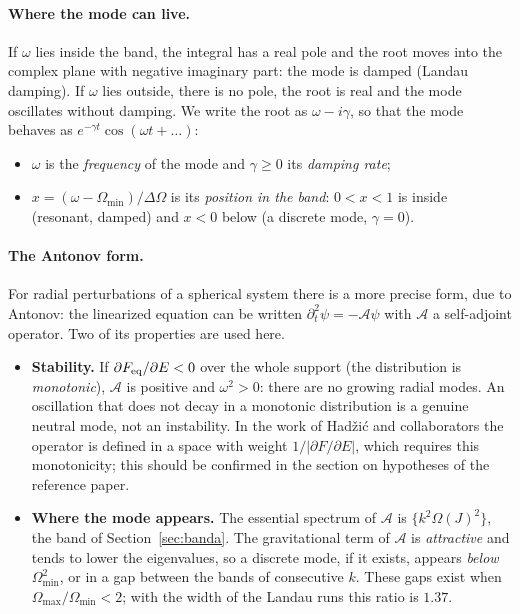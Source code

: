 \documentclass[11pt,a4paper]{article}
\begin{document}
\paragraph{Where the mode can live.} If $\omega$ lies inside the band, the integral has a
real pole and the root moves into the complex plane with negative imaginary part: the
mode is damped (Landau damping). If $\omega$ lies outside, there is no pole, the root is real
and the mode oscillates without damping. We write the root as $\omega-i\gamma$, so that the mode
behaves as $e^{-\gamma t}\cos(\omega t+\dots)$:
\begin{itemize}
\item $\omega$ is the \emph{frequency} of the mode and $\gamma\ge0$ its \emph{damping rate};
\item $x=(\omega-\Omega_{\min})/\Delta\Omega$ is its \emph{position in the band}: $0<x<1$ is inside
(resonant, damped) and $x<0$ below (a discrete mode, $\gamma=0$).
\end{itemize}

\paragraph{The Antonov form.}
\label{sec:antonov}
For radial perturbations of a spherical system there is a more precise form, due to
Antonov: the linearized equation can be written $\partial_t^2\psi=-\mathcal A\psi$ with $\mathcal A$ a
self-adjoint operator. Two of its properties are used here.
\begin{itemize}
\item \textbf{Stability.} If $\partial F_{\rm eq}/\partial E<0$ over the whole support (the
distribution is \emph{monotonic}), $\mathcal A$ is positive and $\omega^2>0$: there are no
growing radial modes. An oscillation that does not decay in a monotonic distribution is
a genuine neutral mode, not an instability. In the work of Hadžić and collaborators the
operator is defined in a space with weight $1/|\partial F/\partial E|$, which requires this
monotonicity; this should be confirmed in the section on hypotheses of the reference
paper.
\item \textbf{Where the mode appears.} The essential spectrum of $\mathcal A$ is
$\{k^2\Omega(J)^2\}$, the band of Section~\ref{sec:banda}. The gravitational term of $\mathcal A$ is
\emph{attractive} and tends to lower the eigenvalues, so a discrete mode, if it exists,
appears \emph{below} $\Omega_{\min}^2$, or in a gap between the bands of consecutive $k$. These gaps
exist when $\Omega_{\max}/\Omega_{\min}<2$; with the width of the Landau runs this ratio is $1.37$.
\end{itemize}
\end{document}
